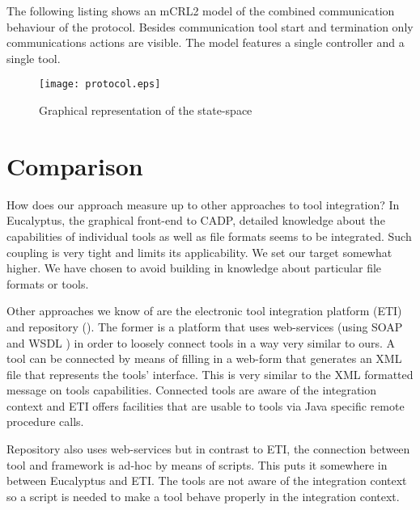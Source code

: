 \documentclass{article}
\begin{document}
  The following listing shows an mCRL2 model of the combined communication
  behaviour of the protocol. Besides communication tool start and termination
  only communications actions are visible. The model features a single
  controller and a single tool.

  \addtolength{\oddsidemargin}{-2cm}
  \addtolength{\evensidemargin}{-2cm}
  \small  \normalsize

  \pagebreak
  \addtolength{\oddsidemargin}{2cm}
  \addtolength{\evensidemargin}{2cm}

  \begin{figure}[H]
   \texttt{[image: protocol.eps]}
   \caption{Graphical representation of the state-space}
  \end{figure}

 \section{Comparison}
 
  How does our approach measure up to other approaches to tool integration?  In
  Eucalyptus, the graphical front-end to CADP, detailed knowledge about the
  capabilities of individual tools as well as file formats seems to be
  integrated. Such coupling is very tight and limits its applicability. We set
  our target somewhat higher. We have chosen to avoid building in knowledge
  about particular file formats or tools.
  
  Other approaches we know of are the electronic tool integration platform
  (ETI) \cite{RICVT} and repository (\cite{SFAV}). The former is a platform
  that uses web-services (using SOAP \cite{SOAP} and WSDL \cite{2001-WSDL})
  in order to loosely connect tools in a way very similar to ours. A tool can
  be connected by means of filling in a web-form that generates an XML file
  that represents the tools' interface.  This is very similar to the XML
  formatted message on tools capabilities. Connected tools are aware of the
  integration context and ETI offers facilities that are usable to tools via
  Java specific remote procedure calls.
  
  Repository also uses web-services but in contrast to ETI, the connection
  between tool and framework is ad-hoc by means of scripts. This puts it
  somewhere in between Eucalyptus and ETI. The tools are not aware of the
  integration context so a script is needed to make a tool behave properly in
  the integration context.
\end{document}

